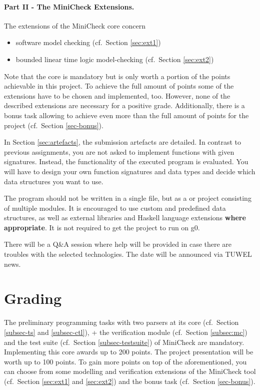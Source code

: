 \documentclass{article}
\begin{document}
\paragraph{Part II - The MiniCheck Extensions.} The extensions of the MiniCheck core concern 
\begin{itemize}
    \item software model checking (cf.~Section \ref{sec:ext1})
    \item bounded linear time logic model-checking (cf.~Section \ref{sec:ext2})
\end{itemize}

Note that the core is mandatory but is only worth a portion of the points achievable in this project. 
To achieve the full amount of points some of the extensions have to be chosen and implemented, too.
However, none of the described extensions are necessary for a positive grade. 
Additionally, there is a bonus task allowing to achieve even more than 
the full amount of points for the project (cf.~Section \ref{sec-bonus}). 
\bigskip

In Section \ref{sec:artefacts}, the submission artefacts are detailed. In contrast to previous assignments, you are not asked to implement functions with given signatures. 
Instead, the functionality of the executed program is evaluated. 
You will have to design your own function signatures and data types and decide 
which data structures you want to use.

The program should not be written in a single file, but as a \href{https://docs.haskellstack.org/en/stable/README/}{} 
or \href{https://cabal.readthedocs.io/en/3.4/}{} project consisting of multiple modules. 
It is encouraged to use custom and predefined data structures, as well as external libraries 
and Haskell language extensions \textbf{where appropriate}. It is not required to get the project to run on g0.

There will be a Q\&A session where help will be provided in case there are troubles with the selected technologies. 
The date will be announced via TUWEL news.

\section{Grading}

The preliminary programming tasks with two parsers at its core (cf.~Section \ref{subsec-ts} and \ref{subsec-ctl}), +
the verification module (cf.~Section \ref{subsec:mc}) and the test suite (cf.~Section \ref{subsec-testsuite}) 
of MiniCheck are mandatory. 
Implementing this core awards up to 200 points. The project presentation will be worth up to 100 points. 
To gain more points on top of the aforementioned, you can choose from some modelling 
and verification extensions of the MiniCheck tool (cf.~Section \ref{sec:ext1} and \ref{sec:ext2}) 
and the bonus task (cf.~Section \ref{sec-bonus}).
\end{document}
